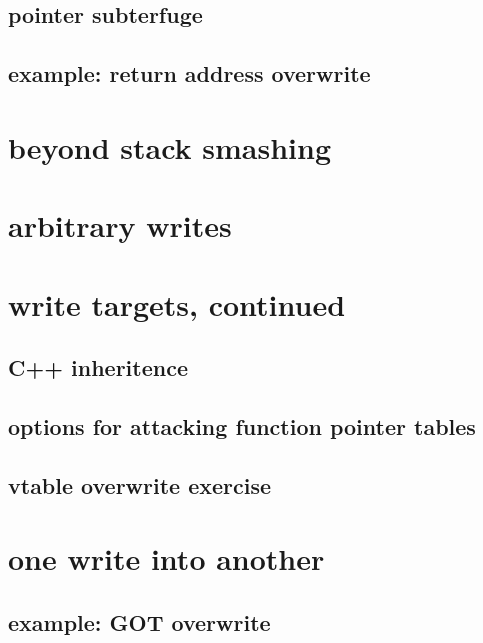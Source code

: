 \subsection{pointer subterfuge}


\subsection{example: return address overwrite}


\section{beyond stack smashing}


\section{arbitrary writes}


\section{write targets, continued}

\subsection{C++ inheritence}


\subsection{options for attacking function pointer tables}


\subsection{vtable overwrite exercise}


\section{one write into another}


\subsection{example: GOT overwrite}


